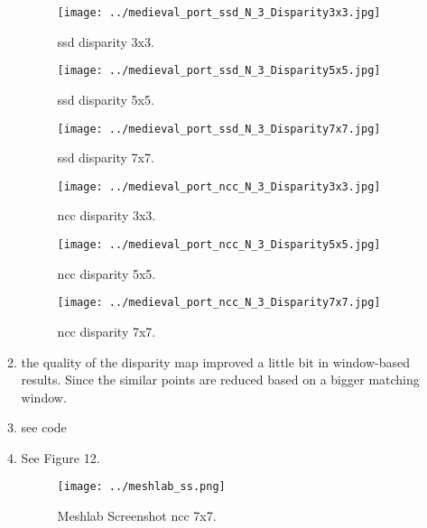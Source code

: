 \documentclass[a4paper, twoside, english]{article}
\begin{document}
\begin{enumerate}
\begin{enumerate}
\begin{figure}[h!]
\begin{minipage}[b]{0.3\textwidth}
				\texttt{[image: ../medieval\_port\_ssd\_N\_3\_Disparity3x3.jpg]}
				\caption{ssd disparity 3x3.}
			\end{minipage}
			\hfill
			\begin{minipage}[b]{0.3\textwidth}
				\texttt{[image: ../medieval\_port\_ssd\_N\_3\_Disparity5x5.jpg]}
				\caption{ssd disparity 5x5.}
			\end{minipage}
			\hfill
			\begin{minipage}[b]{0.3\textwidth}
				\texttt{[image: ../medieval\_port\_ssd\_N\_3\_Disparity7x7.jpg]}
				\caption{ssd disparity 7x7.}
			\end{minipage}
			\hfill
			\begin{minipage}[b]{0.3\textwidth}
				\texttt{[image: ../medieval\_port\_ncc\_N\_3\_Disparity3x3.jpg]}
				\caption{ncc disparity 3x3.}
			\end{minipage}
			\hfill
			\begin{minipage}[b]{0.3\textwidth}
				\texttt{[image: ../medieval\_port\_ncc\_N\_3\_Disparity5x5.jpg]}
				\caption{ncc disparity 5x5.}
			\end{minipage}
			\hfill
			\begin{minipage}[b]{0.3\textwidth}
				\texttt{[image: ../medieval\_port\_ncc\_N\_3\_Disparity7x7.jpg]}
				\caption{ncc disparity 7x7.}
			\end{minipage}
			\hfill
		\end{figure} 
		\item the quality of the disparity map improved a little bit in window-based results. Since the similar points are reduced based on a bigger matching window.
		\item see code
		\item See Figure 12.
		\begin{figure}
				\texttt{[image: ../meshlab\_ss.png]}
				\caption{Meshlab Screenshot ncc 7x7.}
		\end{figure}
	\end{enumerate}
	

\end{enumerate}
\end{document}
